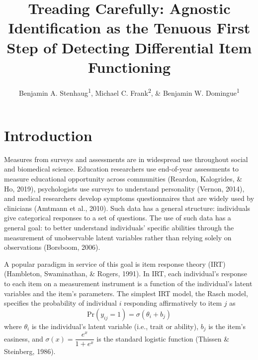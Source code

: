 \documentclass[
  english,
  man,floatsintext]{apa6}
\title{Treading Carefully: Agnostic Identification as the Tenuous First Step of Detecting Differential Item Functioning}
\author{Benjamin A. Stenhaug\textsuperscript{1}, Michael C. Frank\textsuperscript{2}, \& Benjamin W. Domingue\textsuperscript{1}}
\date{}
\affiliation{\vspace{0.5cm}\textsuperscript{1} The Graduate School of Education, Stanford University\\\textsuperscript{2} Department of Psychology, Stanford University}
\begin{document}
\maketitle

\hypertarget{intro}{%
\section{Introduction}\label{intro}}

Measures from surveys and assessments are in widespread use throughout social and biomedical science. Education researchers use end-of-year assessments to measure educational opportunity across communities (Reardon, Kalogrides, \& Ho, 2019), psychologists use surveys to understand personality (Vernon, 2014), and medical researchers develop symptoms questionnaires that are widely used by clinicians (Amtmann et al., 2010). Such data has a general structure: individuals give categorical responses to a set of questions. The use of such data has a general goal: to better understand individuals' specific abilities through the measurement of unobservable latent variables rather than relying solely on observations (Borsboom, 2006).

A popular paradigm in service of this goal is item response theory (IRT) (Hambleton, Swaminathan, \& Rogers, 1991). In IRT, each individual's response to each item on a measurement instrument is a function of the individual's latent variables and the item's parameters. The simplest IRT model, the Rasch model, specifies the probability of individual \(i\) responding affirmatively to item \(j\) as
\begin{equation}
\text{Pr}(y_{ij} = 1) = \sigma(\theta_i + b_j)
\end{equation}
where \(\theta_i\) is the individual's latent variable (i.e., trait or ability), \(b_j\) is the item's easiness, and \(\sigma(x) = \dfrac{e^x}{1 + e^x}\) is the standard logistic function (Thissen \& Steinberg, 1986).
\end{document}
